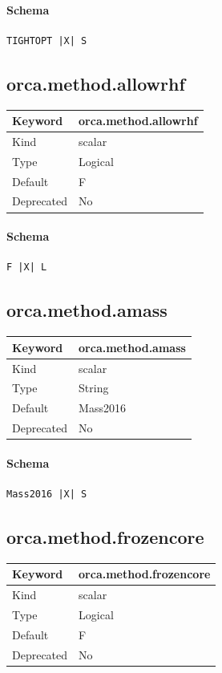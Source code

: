 \documentclass[11pt]{article}
\begin{document}
{{{{{\paragraph{Schema}
\begin{Verbatim}
TIGHTOPT |X| S
\end{Verbatim}

\subsection{orca.method.allowrhf}
\label{kw:orca-method-allowrhf}
\begin{longtable}{|p{1.5in}|p{4.5in}|}
\hline
Keyword & orca.method.allowrhf \\
\hline
Kind & scalar \\
\hline
Type & Logical \\
\hline
Default & F \\
\hline
Deprecated & No \\
\hline
\end{longtable}
\paragraph{Schema}
\begin{Verbatim}
F |X| L
\end{Verbatim}

\subsection{orca.method.amass}
\label{kw:orca-method-amass}
\begin{longtable}{|p{1.5in}|p{4.5in}|}
\hline
Keyword & orca.method.amass \\
\hline
Kind & scalar \\
\hline
Type & String \\
\hline
Default & Mass2016 \\
\hline
Deprecated & No \\
\hline
\end{longtable}
\paragraph{Schema}
\begin{Verbatim}
Mass2016 |X| S
\end{Verbatim}

\subsection{orca.method.frozencore}
\label{kw:orca-method-frozencore}
\begin{longtable}{|p{1.5in}|p{4.5in}|}
\hline
Keyword & orca.method.frozencore \\
\hline
Kind & scalar \\
\hline
Type & Logical \\
\hline
Default & F \\
\hline
Deprecated & No \\
\hline
\end{longtable}
}}}}}
\end{document}
